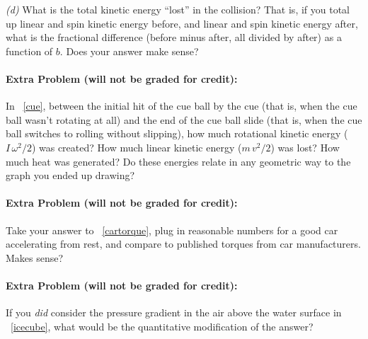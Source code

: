 \documentclass[12pt]{article}
\begin{document}
\textsl{(d)} What is the total kinetic energy ``lost'' in the
collision? That is, if you total up linear and spin kinetic energy
before, and linear and spin kinetic energy after, what is the
fractional difference (before minus after, all divided by after) as a
function of $b$.  Does your answer make sense?

\paragraph{Extra Problem (will not be graded for credit):}%
In \problemname~\ref{cue}, between the initial hit of the cue ball by the cue (that is, when the
cue ball wasn't rotating at all) and the end of the cue ball
slide (that is, when the cue ball switches to rolling without
slipping), how much rotational kinetic energy ($I\,\omega^2 / 2$) was
created? How much linear kinetic energy ($m\,v^2 / 2$) was lost? How
much heat was generated? Do these energies relate in any geometric way
to the graph you ended up drawing?

\paragraph{Extra Problem (will not be graded for credit):}%
Take your answer to \problemname~\ref{cartorque}, plug in reasonable
numbers for a good car accelerating from rest, and compare to
published torques from car manufacturers. Makes sense?

\paragraph{Extra Problem (will not be graded for credit):}%
If you \emph{did} consider the pressure gradient in the air above the
water surface in \problemname~\ref{icecube}, what would be the
quantitative modification of the answer?
\end{document}
